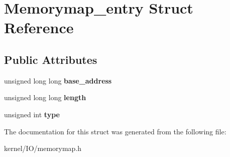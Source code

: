 \hypertarget{structMemorymap__entry}{}\section{Memorymap\+\_\+entry Struct Reference}
\label{structMemorymap__entry}
\subsection*{Public Attributes}
\begin{DoxyCompactItemize}
\item 
unsigned long long {\bfseries base\+\_\+address}\hypertarget{structMemorymap__entry_af36bf7120067d40b0a6bb90dc6b6bb09}{}\label{structMemorymap__entry_af36bf7120067d40b0a6bb90dc6b6bb09}

\item 
unsigned long long {\bfseries length}\hypertarget{structMemorymap__entry_a3bd25b24d9a9f2221398142657976ffa}{}\label{structMemorymap__entry_a3bd25b24d9a9f2221398142657976ffa}

\item 
unsigned int {\bfseries type}\hypertarget{structMemorymap__entry_abd7c2270a61e44ff61afa0e01560f9a8}{}\label{structMemorymap__entry_abd7c2270a61e44ff61afa0e01560f9a8}

\end{DoxyCompactItemize}


The documentation for this struct was generated from the following file\+:\begin{DoxyCompactItemize}
\item 
kernel/\+I\+O/memorymap.\+h\end{DoxyCompactItemize}
